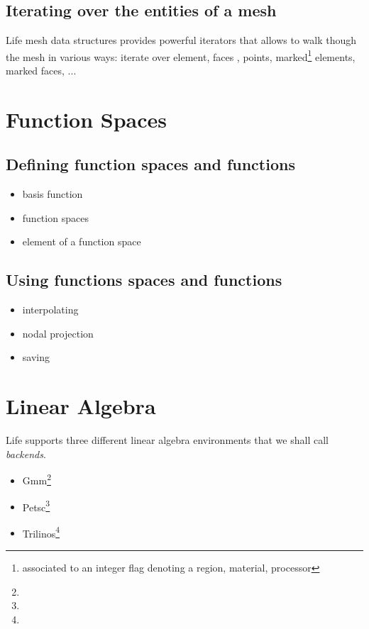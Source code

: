 \documentclass[11pt]{article}
\begin{document}
\subsection{Iterating over the entities of a mesh}

Life mesh data structures provides powerful iterators that allows to
walk though the mesh in various ways: iterate over element, faces ,
points, marked\footnote{associated to an integer flag denoting a
  region, material, processor} elements, marked faces, ...



\section{Function Spaces}

\subsection{Defining function spaces and functions}

\begin{itemize}
\item basis function
\item function spaces
\item element of a function space
\end{itemize}

\subsection{Using functions spaces and functions}

\begin{itemize}
\item interpolating
\item nodal projection
\item saving
\end{itemize}


\section{Linear Algebra}
\label{sec:linear-algebra}


Life supports three different linear algebra environments that we
shall call \emph{backends}.
\begin{itemize}
\item Gmm\footnote{}
\item Petsc\footnote{}
\item Trilinos\footnote{}
\end{itemize}
\end{document}
